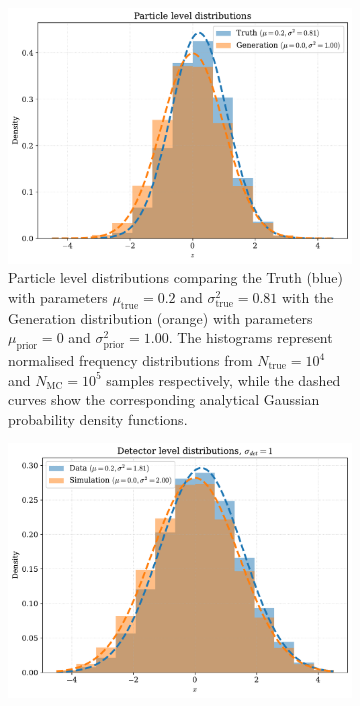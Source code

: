 \begin{figure}
  \centering
  \begin{subfigure}[t]{0.48\textwidth}
    \centering
    \includegraphics[width=\textwidth]{figures/chapter-07/unbinned_cor-particle_level.pdf}
    \caption{Particle level distributions comparing the Truth (blue) with parameters $\mu_{\text{true}} = 0.2$ and $\sigma^2_{\text{true}} = 0.81$ with the Generation distribution (orange) with parameters $\mu_{\text{prior}} = 0$ and $\sigma^2_{\text{prior}} = 1.00$.
    The histograms represent normalised frequency distributions from $N_{\text{true}} = 10^4$ and $N_{\text{MC}} = 10^5$ samples respectively, while the dashed curves show the corresponding analytical Gaussian probability density functions.}
    \label{fig:particle-level}
  \end{subfigure}
  \hfill
  \begin{subfigure}[t]{0.48\textwidth}
    \centering
    \includegraphics[width=\textwidth]{figures/chapter-07/unbinned_cor-detector_level.pdf}

\end{subfigure}
\end{figure}
